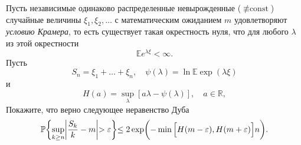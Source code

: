 \begin{problem}
Пусть независимые одинаково распределенные невырожденные ($\not \equiv \text{const}$) случайные величины $\xi_1,\xi_2,\dots$ с математическим ожиданием $m$ удовлетворяют \textit{условию Крамера}, то есть существует такая окрестность нуля, что для любого $\lambda$ из этой окрестности 
\begin{equation*}
\mathbb{E}e^{\lambda \xi}<\infty.
\end{equation*}
Пусть 
$$
S_n = \xi_1+\dots+\xi_n, \quad \psi(\lambda) = \ln \mathbb{E}\exp(\lambda\xi)
$$ 
и 
\begin{equation*}
H(a) = \sup_{\lambda}[a\lambda - \psi(\lambda)],\quad a\in \mathbb{R},
\end{equation*}
Покажите, что верно следующее неравенство Дуба
\begin{equation*}
\PR\biggl\{\sup_{k\geq n}\biggr|\frac{S_k}{k}-m\biggl|>\varepsilon\biggl\}\leq 2\exp\biggl(-\min\Big[H(m-\varepsilon),H(m+\varepsilon)\Bigr]n\biggr).
\end{equation*}
\end{problem}

